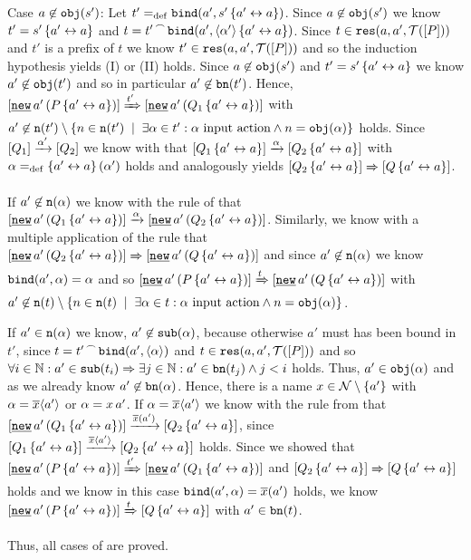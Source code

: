 \begin{prf}
\begin{description}
\begin{description}
\begin{old}
\item[Case $a\not\in\mathtt{obj}(s')$:] Let $t'=_{\mathrm{def}}{}\mathtt{bind}(a',s'\left\{a'\leftrightarrow{}a\right\})$. Since $a\not\in\mathtt{obj}(s')$ we know $t'=s'\left\{a'\leftrightarrow{}a\right\}$ and $t={t'}^{\,\frown{}\,}{\mathtt{bind}(a',\langle\alpha'\rangle\left\{a'\leftrightarrow{}a\right\})}$. Since $t\in\res{a}{a'}{P}$ and $t'$ is a prefix of $t$ we know $t'\in\res{a}{a'}{P}$ and so the induction hypothesis yields (I) or (II) holds. Since $a\not\in\mathtt{obj}(s')$ and $t'=s'\left\{a'\leftrightarrow{}a\right\}$ we know $a'\not\in\mathtt{obj}(t')$ and so in particular $a'\not\in\mathtt{bn}(t')$. Hence, $\ec{\procres[()]{a'}{P\transp{a'}{a}}}\bigstep{t'}\ec{\procres[()]{a'}{Q_1\transp{a'}{a}}}$ with $a'\nin\n{t'}\setminus\set[\exists\alpha\in{}t': \alpha \text{ input action}\wedge n=\obj{\alpha}]{n\in{}\n{t'}}$ holds. Since $\left[Q_1\right]\xrightarrow{\alpha'}\left[Q_2\right]$ we know with  that $\left[Q_1\left\{a'\leftrightarrow{}a\right\}\right]\xrightarrow{\alpha}\left[Q_2\left\{a'\leftrightarrow{}a\right\}\right]$ with $\alpha=_{\mathrm{def}}\left\{a'\leftrightarrow{}a\right\}(\alpha')$ holds and analogously  yields $\left[Q_2\left\{a'\leftrightarrow{}a\right\}\right]\xRightarrow{}\left[Q\left\{a'\leftrightarrow{}a\right\}\right]$.

If $a'\not\in\mathtt{n}(\alpha)$ we know with the \eres{} rule of  that $\ec{\procres[()]{a'}{Q_1\transp{a'}{a}}}\transs{\alpha}\ec{\procres[()]{a'}{Q_2\transp{a'}{a}}}$. Similarly, we know with a multiple application of the \eres{} rule that $\ec{\procres[()]{a'}{Q_2\transp{a'}{a}}}\bigstep{}\ec{\procres[()]{a'}{Q\transp{a'}{a}}}$ and since $a'\not\in\mathtt{n}(\alpha)$ we know $\mathtt{bind}(a',\alpha)=\alpha$ and so $\ec{\procres[()]{a'}{P\transp{a'}{a}}}\bigstep{t}\ec{\procres[()]{a'}{Q\transp{a'}{a}}}$ with $a'\nin\n{t}\setminus\set[\exists\alpha\in{}t: \alpha \text{ input action}\wedge n=\obj{\alpha}]{n\in{}\n{t}}$.

If $a'\in\mathtt{n}(\alpha)$ we know, $a'\not\in\mathtt{sub}(\alpha)$, because otherwise $a'$ must has been bound in $t'$, since $t={t'}^{\,\frown{}\,}{\mathtt{bind}(a',\langle\alpha\rangle)}$ and $t\in\res{a}{a'}{P}$ and so $\forall{}i\in\mathbb N: a'\in\mathtt{sub}(t_i) \Rightarrow \exists{}j\in\mathbb N: a'\in\mathtt{bn}(t_j)\wedge{}j<i$ holds. Thus, $a'\in\mathtt{obj}(\alpha)$ and as we already know $a'\not\in\mathtt{bn}(\alpha)$. Hence, there is a name $x\in\names\setminus\set{a'}$ with $\alpha=\overline{x}\langle a'\rangle$ or $\alpha=x\,a'$. If $\alpha=\overline{x}\langle a'\rangle$ we know with the \eopen{} rule from  that $\ec{\procres[()]{a'}{Q_1\transp{a'}{a}}}\transs{\bout{x}{a'}}\ec{Q_2\transp{a'}{a}}$, since $\left[Q_1\left\{a'\leftrightarrow{}a\right\}\right]\xrightarrow{\overline{x}\langle a'\rangle}\left[Q_2\left\{a'\leftrightarrow{}a\right\}\right]$ holds. Since we showed that $\ec{\procres[()]{a'}{P\transp{a'}{a}}}\bigstep{t'}\ec{\procres[()]{a'}{Q_1\transp{a'}{a}}}$ and $\left[Q_2\left\{a'\leftrightarrow{}a\right\}\right]\xRightarrow{}\left[Q\left\{a'\leftrightarrow{}a\right\}\right]$ holds and we know in this case $\mathtt{bind}(a',\alpha)=\overline{x}(a')$ holds, we know $\ec{\procres[()]{a'}{P\transp{a'}{a}}}\bigstep{t}\ec{Q\transp{a'}{a}}$ with $a'\in\mathtt{bn}(t)$.
\end{old}
\end{description}
\end{description}
Thus, all cases of  are proved.
\end{prf}

